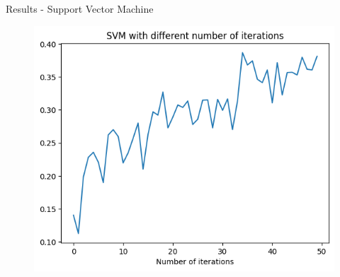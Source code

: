 \documentclass{beamer}
\begin{document}
\begin{frame}[t]{Results - Support Vector Machine}
	\vspace{-3mm}
	\begin{figure}[h]
		\centering
		\includegraphics[width=0.8\linewidth]{images/SVM/precision.png}
	\end{figure}
\end{frame}
\end{document}
